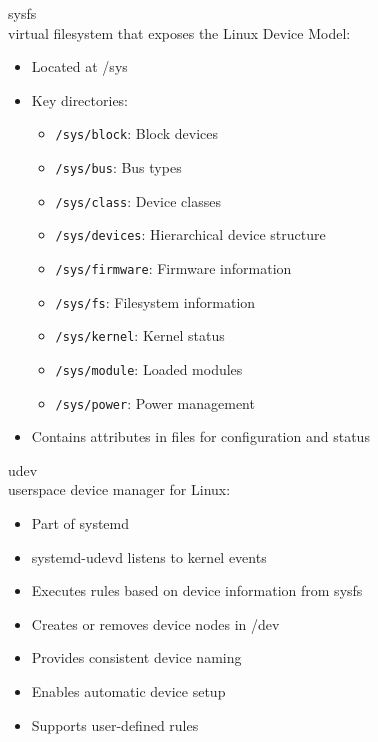 \multend


\begin{definition}{sysfs}\\
    virtual filesystem that exposes the Linux Device Model:
    \begin{itemize}
        \item Located at /sys
        \item Key directories:
            \begin{itemize}
                \item \texttt{/sys/block}: Block devices
                \item \texttt{/sys/bus}: Bus types
                \item \texttt{/sys/class}: Device classes
                \item \texttt{/sys/devices}: Hierarchical device structure
                \item \texttt{/sys/firmware}: Firmware information
                \item \texttt{/sys/fs}: Filesystem information
                \item \texttt{/sys/kernel}: Kernel status
                \item \texttt{/sys/module}: Loaded modules
                \item \texttt{/sys/power}: Power management
            \end{itemize}
        \item Contains attributes in files for configuration and status
    \end{itemize}
\end{definition}

\begin{definition}{udev}\\
    userspace device manager for Linux:
    \begin{itemize}
        \item Part of systemd
        \item systemd-udevd listens to kernel events
        \item Executes rules based on device information from sysfs
        \item Creates or removes device nodes in /dev
        \item Provides consistent device naming
        \item Enables automatic device setup
        \item Supports user-defined rules
    \end{itemize}
\end{definition}

